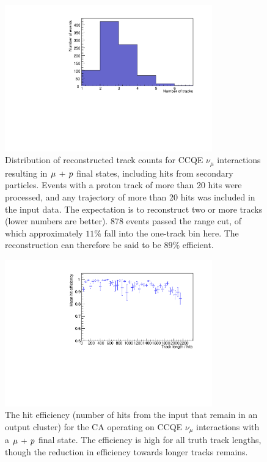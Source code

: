 \begin{figure}
    \centering
    \includegraphics[angle=-90,width=0.8\textwidth]{chapters/cellularautomaton_images/ccqe-trackcount}
    \caption[Number of reconstructed tracks in CCQE events]{\label{fig:ca-ccqe-full-trackcounts}Distribution of reconstructed track counts for CCQE $\nu_\mu$ interactions resulting in $\mu\,+\,p$ final states, including hits from secondary particles. Events with a proton track of more than 20 hits were processed, and any trajectory of more than 20 hits was included in the input data. The expectation is to reconstruct two or more tracks (lower numbers are better). 878 events passed the range cut, of which approximately $11\%$ fall into the one-track bin here. The reconstruction can therefore be said to be $89\%$ efficient.}
\end{figure}

\begin{figure}
    \centering
    \includegraphics[angle=-90,width=0.8\textwidth]{chapters/cellularautomaton_images/ccqe-efficiency}
    \caption[Hit efficiency for CCQE events reconstructed with a CA]{\label{fig:ca-ccqe-full-efficiency}The hit efficiency (number of hits from the input that remain in an output cluster) for the CA operating on CCQE $\nu_\mu$ interactions with a $\mu\,+\,p$ final state. The efficiency is high for all truth track lengths, though the reduction in efficiency towards longer tracks remains.}
\end{figure}

